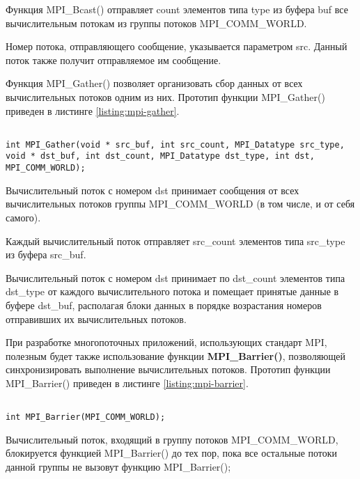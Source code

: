 \begin{itemize}
	Функция MPI\_Bcast() отправляет count элементов типа type из буфера buf все вычислительным потокам из группы потоков MPI\_COMM\_WORLD.

	Номер потока, отправляющего сообщение, указывается параметром src. Данный поток также получит отправляемое им сообщение.

	Функция MPI\_Gather() позволяет организовать сбор данных от всех вычислительных потоков одним из них. Прототип функции MPI\_Gather() приведен в листинге \ref{listing:mpi-gather}.

\begin{lstlisting}

int MPI_Gather(void * src_buf, int src_count, MPI_Datatype src_type, void * dst_buf, int dst_count, MPI_Datatype dst_type, int dst, MPI_COMM_WORLD);

\end{lstlisting}
\mylistingend

	Вычислительный поток с номером dst принимает сообщения от всех вычислительных потоков группы MPI\_COMM\_WORLD (в том числе, и от себя самого).

	Каждый вычислительный поток отправляет src\_count элементов типа src\_type из буфера src\_buf.

	Вычислительный поток с номером dst принимает по dst\_count элементов типа dst\_type от каждого вычислительного потока и помещает принятые данные в буфере dst\_buf, располагая блоки данных в порядке возрастания номеров отправивших их вычислительных потоков.

\end{itemize}

При разработке многопоточных приложений, использующих стандарт MPI, полезным будет также использование функции {\bf MPI\_Barrier()}, позволяющей синхронизировать выполнение вычислительных потоков. Прототип функции MPI\_Barrier() приведен в листинге \ref{listing:mpi-barrier}.

\begin{lstlisting}

int MPI_Barrier(MPI_COMM_WORLD);

\end{lstlisting}
\mylistingend

Вычислительный поток, входящий в группу потоков MPI\_COMM\_WORLD, блокируется функцией MPI\_Barrier() до тех пор, пока все остальные потоки данной группы не вызовут функцию MPI\_Barrier();

